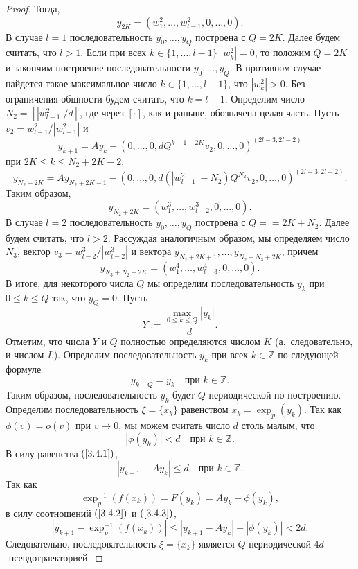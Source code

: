 \documentclass[12pt]{article}
\begin{document}
\begin{proof}
Тогда,
$$y_{2K}=(w^2_1,\ldots,w^2_{l-1},0,\ldots,0).$$
В случае $l=1$ последовательность $y_0,\ldots,y_Q$ построена с $Q=2K$. Далее будем считать, что $l>1$. Если при всех $k\in\{1,\ldots,l-1\}$ $|w^2_k|=0$, то положим $Q=2K$ и закончим построение последовательности $y_0,\ldots,y_Q$. В противном случае найдется такое максимальное число $k\in\{1,\ldots,l-1\}$, что $|w^2_k|>0$. Без ограничения общности будем считать, что $k=l-1$. 
Определим число $N_2=[|w^2_{l-1}|/d]$, где через $[\cdot]$, как и раньше, обозначена целая часть. 
Пусть
$v_2 = w^2_{l-1}/|w^2_{l-1}|$ и
 $$y_{k+1}=Ay_{k}-(0,\ldots,0,dQ^{k+1-2K}v_2,0,\ldots,0)^{(2l-3,2l-2)}$$
 при $2K\leq k\leq N_2+2K-2$,
 $$y_{N_2+2K}=Ay_{N_2+2K-1}-(0,\ldots,0,d(|w^2_{l-1}| - N_2)Q^{N_2}v_2,0,\ldots,0)^{(2l-3,2l-2)}.$$
Таким образом,
 $$y_{N_2+2K}=(w^3_1,\ldots,w^3_{l-2},0,\ldots,0).$$
 В случае $l=2$ последовательность $y_0,\ldots,y_Q$ построена с $Q=\allowbreak=2K+N_2$. Далее будем считать, что $l>2$.
Рассуждая аналогичным образом, мы определяем число $N_3$, вектор $v_3=w^3_{l-2}/|w^3_{l-2}|$ и вектора $y_{N_2+2K+1},\ldots,y_{N_2+N_3+2K}$, причем
$$y_{N_3+N_2+2K}=(w^4_1,\ldots,w^4_{l-3},0,\ldots,0).$$
В итоге, для некоторого числа $Q$ мы определим последовательность $y_k$ при $0\leq k\leq Q$ так, что $y_Q=0$.  
Пусть 
$$Y:=\frac{\max_{0\leq k\leq Q}|y_k|}{d}.$$
Отметим, что числа $Y$ и $Q$ полностью определяются числом $K$ (а,~следовательно, и числом $L$).
Определим последовательность $y_k$ при всех $k\in\mathbb{Z}$ по следующей формуле
$$y_{k+Q}=y_k\quad\textrm{при }k\in\mathbb{Z}.$$
Таким образом, последовательность $y_k$ будет $Q$-периодической по построению. 
 Определим последовательность $\xi=\{x_k\}$ равенством $x_k=\exp_p(y_k)$. Так как $\phi(v)=o(v)$ при $v\rightarrow0$, мы можем считать число $d$ столь малым, что
\begin{equation}
\label{3.4.2}
|\phi(y_k)|<d\quad\mbox{при }k\in\mathbb{Z}.
\end{equation} 
  В силу равенства $(\ref{3.4.1})$,
  \begin{equation}
  \label{3.4.3}
 |y_{k+1}-Ay_k|\leq d\quad\mbox{при }k\in\mathbb{Z}.
 \end{equation}
 Так как 
 $$\exp_p^{-1}(f(x_k))=F(y_k)=Ay_k+\phi(y_k),$$
 в силу соотношений $(\ref{3.4.2})$ и $(\ref{3.4.3})$,
 $$|y_{k+1}-\exp_p^{-1}(f(x_k))|\leq|y_{k+1}-Ay_k|+|\phi(y_k)|<2d.$$
 Следовательно, последовательность $\xi\!=\!\{x_k\}$ является $Q$-периоди\-ческой $4d$-псевдотраекторией.
 

\end{proof}
\end{document}
